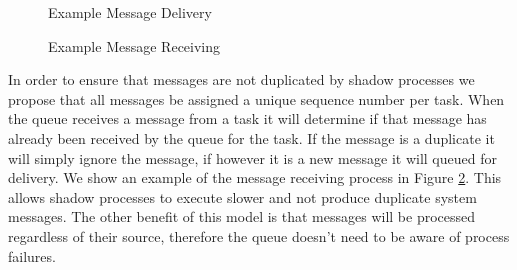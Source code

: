 \begin{figure}[hHtb]
\centering
{}
\caption { Example Message Delivery }
\label{queue_message_delivery}
\end{figure}

\begin{figure}[hHtb]
\centering
{}
\caption { Example Message Receiving }
\label{queue_message_receiving}
\end{figure}

In order to ensure that messages are not duplicated by shadow
processes we propose that all messages be assigned a unique sequence
number per task. When the queue receives a message from a task it will
determine if that message has already been received by the queue for
the task. If the message is a duplicate it will simply ignore the
message, if however it is a new message it will queued for
delivery. We show an example of the message receiving process in
Figure \ref{queue_message_receiving}. This allows shadow processes to execute
slower and not produce duplicate system messages. The other benefit of
this model is that messages will be processed regardless of their
source, therefore the queue doesn't need to be aware of process
failures.
